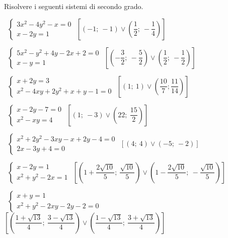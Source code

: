 \begin{esercizio}[\Ast]
 \label{ese:6.7}
Risolvere i seguenti sistemi di secondo grado.
 \begin{enumeratea}
 \item~\(\left\{\begin{array}{l}3x^2-4y^2-x=0\\x-2y=1\end{array}\right.\)
\hfill\(\left[\left(-1;~-1\right)\vee \left(\dfrac 1 2;~-\dfrac 1 
4\right)\right]\)
 
\item~\(\left\{\begin{array}{l}5x^2-y^2+4y-2x+2=0\\x-y=1\end{array}\right.\)
\hfill\(\left[\left(-\dfrac 3 2;~-\dfrac 5 2\right) \vee 
       \left(\dfrac 1 2;~-\dfrac 1 2\right)\right]\)
 
\item~\(\left\{\begin{array}{l}x+2y=3\\x^2-4xy+2y^2+x+y-1=0\end{array}
\right.\)
\hfill\(\left[\left(1;~1\right)\vee \left(\dfrac{10} 7;
    \dfrac{11}{14}\right)\right]\)
 \item~\(\left\{\begin{array}{l}x-2y-7=0\\x^2-xy=4\end{array}\right.\)
\hfill\(\left[\left(1;~-3\right)\vee \left(22;~\dfrac{15}{2}\right)\right]\)
\item~\(\left\{\begin{array}{l}x^2+2y^2-3xy-x+2y-4=0\\2x-3y+4=0\end{array}
\right.\)
\hfill\(\left[\left(4;~4\right)\vee \left(-5;~-2\right)\right]\)
 \item~\(\left\{\begin{array}{l}x-2y=1\\x^2+y^2-2x=1\end{array}\right.\)
\hfill\(\left[\left(1+\dfrac{2\sqrt{10}} 5;~\dfrac{\sqrt{10}} 5\right)\vee 
\left(1-\dfrac{2\sqrt{10}} 5;~-\dfrac{\sqrt{10}} 5\right)\right]\)
 
\item~\(\left\{\begin{array}{l}x+y=1\\x^2+y^2-2xy-2y-2=0\end{array}\right.\)
\hfill\(\left[\left(\dfrac{1+\sqrt{13}} 4;~\dfrac{3-\sqrt{13}} 4\right)\vee 
\left(\dfrac{1-\sqrt{13}} 4;~\dfrac{3+\sqrt{13}} 4\right)\right]\)
 

\end{enumeratea}
\end{esercizio}
